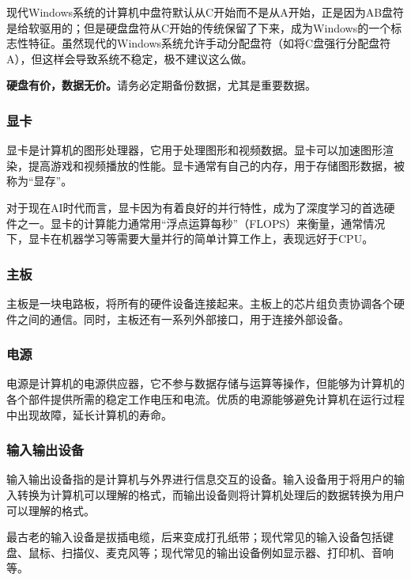 \begin{note}
  现代Windows系统的计算机中盘符默认从C开始而不是从A开始，正是因为AB盘符是给软驱用的；但是硬盘盘符从C开始的传统保留了下来，成为Windows的一个标志性特征。虽然现代的Windows系统允许手动分配盘符（如将C盘强行分配盘符A），但这样会导致系统不稳定，极不建议这么做。
\end{note}

\begin{caution}
\textbf{硬盘有价，数据无价。}请务必定期备份数据，尤其是重要数据。
\end{caution}

\subsubsection{显卡}

显卡是计算机的图形处理器，它用于处理图形和视频数据。显卡可以加速图形渲染，提高游戏和视频播放的性能。显卡通常有自己的内存，用于存储图形数据，被称为“显存”。

对于现在AI时代而言，显卡因为有着良好的并行特性，成为了深度学习的首选硬件之一。显卡的计算能力通常用“浮点运算每秒”（FLOPS）来衡量，通常情况下，显卡在机器学习等需要大量并行的简单计算工作上，表现远好于CPU。

\subsubsection{主板}

主板是一块电路板，将所有的硬件设备连接起来。主板上的芯片组负责协调各个硬件之间的通信。同时，主板还有一系列外部接口，用于连接外部设备。

\subsubsection{电源}

电源是计算机的电源供应器，它不参与数据存储与运算等操作，但能够为计算机的各个部件提供所需的稳定工作电压和电流。优质的电源能够避免计算机在运行过程中出现故障，延长计算机的寿命。

\subsubsection{输入输出设备}

输入输出设备指的是计算机与外界进行信息交互的设备。输入设备用于将用户的输入转换为计算机可以理解的格式，而输出设备则将计算机处理后的数据转换为用户可以理解的格式。

最古老的输入设备是拔插电缆，后来变成打孔纸带；现代常见的输入设备包括键盘、鼠标、扫描仪、麦克风等；现代常见的输出设备例如显示器、打印机、音响等。

